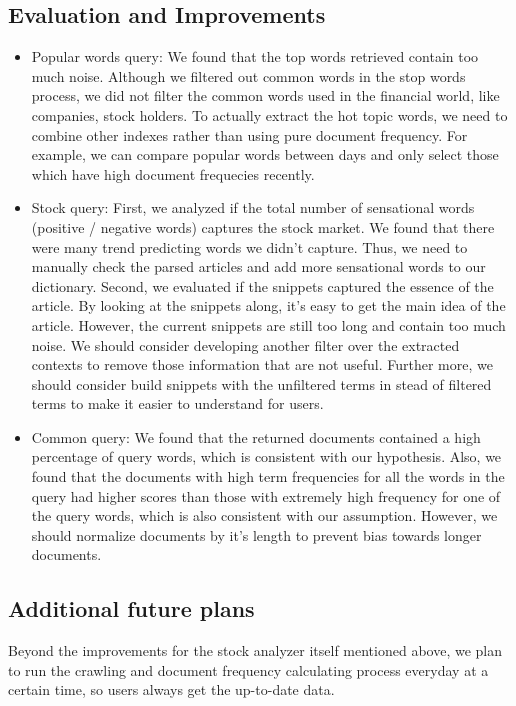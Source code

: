 \documentclass{article}
\begin{document}
\subsection{Evaluation and Improvements}
\begin{itemize}
  \item Popular words query: We found that the top words retrieved contain too much noise. Although we filtered out common words in the stop words process, we did not filter the common words used in the financial world, like companies, stock holders. To actually extract the hot topic words, we need to combine other indexes rather than using pure document frequency. For example, we can compare popular words between days and only select those which have high document frequecies recently.
  \item Stock query: First, we analyzed if the total number of sensational words (positive / negative words) captures the stock market. We found that there were many trend predicting words we didn't capture. Thus, we need to manually check the parsed articles and add more sensational words to our dictionary. Second, we evaluated if the snippets captured the essence of the article. By looking at the snippets along, it's easy to get the main idea of the article. However, the current snippets are still too long and contain too much noise. We should consider developing another filter over the extracted contexts to remove those information that are not useful. Further more, we should consider build snippets with the unfiltered terms in stead of filtered terms to make it easier to understand for users. 
  \item Common query: We found that the returned documents contained a high percentage of query words, which is consistent with our hypothesis. Also, we found that the documents with high term frequencies for all the words in the query had higher scores than those with extremely high frequency for one of the query words, which is also consistent with our assumption. However, we should normalize documents by it's length to prevent bias towards longer documents.
\end{itemize}

\subsection{Additional future plans}
Beyond the improvements for the stock analyzer itself mentioned above, we plan to run the crawling and document frequency calculating process everyday at a certain time, so users always get the up-to-date data.
\end{document}
